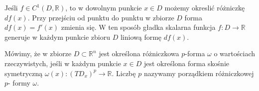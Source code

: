 \documentclass[leqno]{article}
\begin{document}
\begin{justify}
Jeśli $f \in C^1(D, \mathbb{R})$, to w dowolnym punkcie $x \in D$ możemy okreslić różniczkę $df(x)$. Przy przejściu od punktu do punktu w zbiorze $D$
forma $df(x) = f'(x)$ zmienia się. W ten sposób gładka skalarna funkcja $f : D \to \mathbb{R}$ generuje w każdym punkcie zbioru $D$ liniową formę $df(x)$.

\begin{defn}
    Mówimy, że w zbiorze $D \subset \mathbb{R}^n$ jest określona różniczkowa $p$-forma $\omega$ o wartościach rzeczywistych, jeśli w każdym punkcie $x \in D$
    jest określona forma skośnie symetryczną $\omega(x) : (TD_{x})^p \to \mathbb{R}$. Liczbę $p$ nazywamy porządkiem różniczkowej $p$- formy $\omega$.
\end{defn}

\end{justify}
\end{document}
